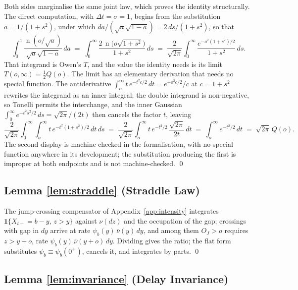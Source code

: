 \documentclass[11pt,a4paper]{article}
\theoremstyle{definition}
\theoremstyle{plain}
\theoremstyle{remark}
\newcommand{\surv}{Q}
\DeclareMathOperator{\nden}{n}
\begin{document}
Both sides marginalise the same joint law, which proves the identity structurally. The direct computation, with $\Delta t = \sigma = 1$, begins from the substitution $a = 1/(1 + s^2)$, under which
$da/(\sqrt{a}\sqrt{1-a}) = 2\, ds/(1 + s^2)$, so that
\[
\int_0^1 \frac{\nden(o/\sqrt{a})}{\sqrt{a}\sqrt{1 - a}}\, da
\;=\; \int_0^\infty \frac{2\,\nden\big(o\sqrt{1 + s^2}\big)}
{1 + s^2}\, ds
\;=\; \frac{2}{\sqrt{2\pi}} \int_0^\infty
\frac{e^{-o^2(1 + s^2)/2}}{1 + s^2}\, ds .
\]
That integrand is Owen's $T$,\cite{owen1956} and the value the identity needs is its limit $T(o, \infty) = \tfrac12 \surv(o)$. The limit has an elementary derivation that needs no special
function. The antiderivative $\int_o^\infty t\, e^{-t^2 c/2}\, dt = e^{-o^2 c/2}/c$ at $c = 1 + s^2$ rewrites the integrand as an inner integral; the double integrand is non-negative, so Tonelli
permits the interchange, and the inner Gaussian $\int_0^\infty 
e^{-t^2 s^2/2}\, ds = \sqrt{2\pi}/(2t)$ then cancels the factor
$t$, leaving
\[
\frac{2}{\sqrt{2\pi}} \int_0^\infty \int_o^\infty t\,
e^{-t^2(1 + s^2)/2}\, dt\, ds
\;=\; \frac{2}{\sqrt{2\pi}} \int_o^\infty t\, e^{-t^2/2}\,
\frac{\sqrt{2\pi}}{2t}\, dt
\;=\; \int_o^\infty e^{-t^2/2}\, dt
\;=\; \sqrt{2\pi}\, \surv(o) .
\]
The second display is machine-checked in the formalisation, with no special function anywhere in its development; the substitution producing the first is improper at both endpoints and is not
machine-checked. \qed

\subsection{Lemma \ref{lem:straddle} (Straddle Law)}

The jump-crossing compensator of Appendix~\ref{app:intensity} integrates
$\mathbf{1}\{X_{t-} = b - y,\, z > y\}$ against $\nu(dz)$ and the occupation of the gap; crossings with gap in $dy$ arrive at rate
$\psi_b(y)\,\bar\nu(y)\,dy$, and among them $O_J > o$ requires $z >
y + o$, rate $\psi_b(y)\,\bar\nu(y + o)\,dy$. Dividing gives the
ratio; the flat form substitutes $\psi_b \equiv \psi_b(0^+)$, cancels it, and integrates by parts. \qed

\subsection{Lemma \ref{lem:invariance} (Delay Invariance)}
\end{document}

